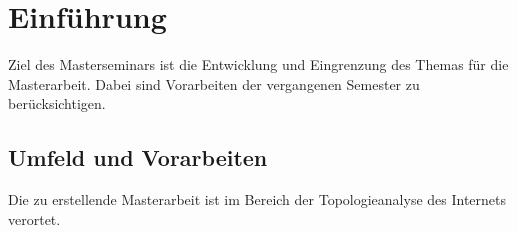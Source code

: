 \newpage

\section{Einführung}

Ziel des Masterseminars ist die Entwicklung und Eingrenzung des Themas für die Masterarbeit.
Dabei sind Vorarbeiten der vergangenen Semester zu berücksichtigen.

\subsection{Umfeld und Vorarbeiten}
Die zu erstellende Masterarbeit ist im Bereich der Topologieanalyse des Internets verortet.
